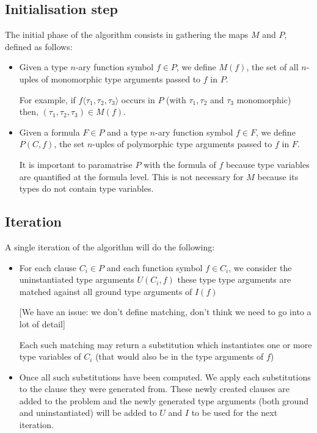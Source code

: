 \documentclass[]{ceurart}
\begin{document}
\subsection{Initialisation step}
The initial phase of the algorithm consists in gathering the maps \(M\) and \(P\), defined as follows:
\begin{itemize}
    \item Given a type \(n\)-ary function symbol \(f \in P\), we define \(M(f)\), the set of all \(n\)-uples of monomorphic type arguments passed to \(f\) in \(P\).

    For example, if \(f\langle \tau_1, \tau_2, \tau_3\rangle\) occurs in \(P\) (with \(\tau_1, \tau_2\) and \( \tau_3\) monomorphic) then, \((\tau_1, \tau_2, \tau_3) \in M(f) \).

 \item Given a formula \(F \in P\) and a type \(n\)-ary function symbol \(f \in F\), we define \(P(C, f)\), the set \(n\)-uples of polymorphic type arguments passed to \(f\) in \(F\). 

    It is important to paramatrise \(P\) with the formula of \(f\) because type variables are quantified at the formula level. This is not necessary for \(M\) because its types do not contain type variables.

\end{itemize}

\subsection{Iteration}
A single iteration of the algorithm will do the following:

\begin{itemize}
   \item For each clause \(C_i \in P\) and each function symbol \(f \in C_i\), we consider the uninstantiated type arguments \(U(C_i, f)\) these type type arguments are matched against all ground type arguments of \(I(f)\)

      [We have an issue: we don't define matching, don't think we need to go into a lot of detail]

      Each such matching may return a substitution which instantiates one or more type variables of \(C_i\) (that would also be in the type arguments of \(f\))

   \item Once all such substitutions have been computed. We apply each substitutions to the clause they were generated from. These newly created clauses are added to the problem and the newly generated type arguments (both ground and uninstantiated) will be added to \(U\) and \(I\) to be used for the next iteration.
\end{itemize}
\end{document}
